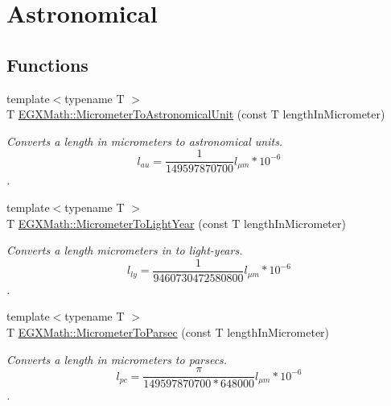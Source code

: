\hypertarget{group___e_g_x_math-_conversions-_length_conversions-_s_i-_micrometer-_astronomical}{}\section{Astronomical}
\label{group___e_g_x_math-_conversions-_length_conversions-_s_i-_micrometer-_astronomical}
\subsection*{Functions}
\begin{DoxyCompactItemize}
\item 
{\footnotesize template$<$typename T $>$ }\\T \mbox{\hyperlink{group___e_g_x_math-_conversions-_length_conversions-_s_i-_micrometer-_astronomical_ga910b8baeb25ec569394e5563afebc70f}{E\+G\+X\+Math\+::\+Micrometer\+To\+Astronomical\+Unit}} (const T length\+In\+Micrometer)
\begin{DoxyCompactList}\small\item\em Converts a length in micrometers to astronomical units. \[ l_{au}= \frac{1}{149597870700} l_{\mu m} * 10^{-6} \]. \end{DoxyCompactList}\item 
{\footnotesize template$<$typename T $>$ }\\T \mbox{\hyperlink{group___e_g_x_math-_conversions-_length_conversions-_s_i-_micrometer-_astronomical_ga17ce0795cd099de3fd453a455f0a2260}{E\+G\+X\+Math\+::\+Micrometer\+To\+Light\+Year}} (const T length\+In\+Micrometer)
\begin{DoxyCompactList}\small\item\em Converts a length micrometers in to light-\/years. \[ l_{ly}= \frac{1}{9460730472580800} l_{\mu m} * 10^{-6} \]. \end{DoxyCompactList}\item 
{\footnotesize template$<$typename T $>$ }\\T \mbox{\hyperlink{group___e_g_x_math-_conversions-_length_conversions-_s_i-_micrometer-_astronomical_gab7d1e9a1568a8691855121c9cf2b38f5}{E\+G\+X\+Math\+::\+Micrometer\+To\+Parsec}} (const T length\+In\+Micrometer)
\begin{DoxyCompactList}\small\item\em Converts a length in micrometers to parsecs. \[ l_{pc}=\frac{\pi}{149597870700 * 648000} l_{\mu m} * 10^{-6} \]. \end{DoxyCompactList}\end{DoxyCompactItemize}


